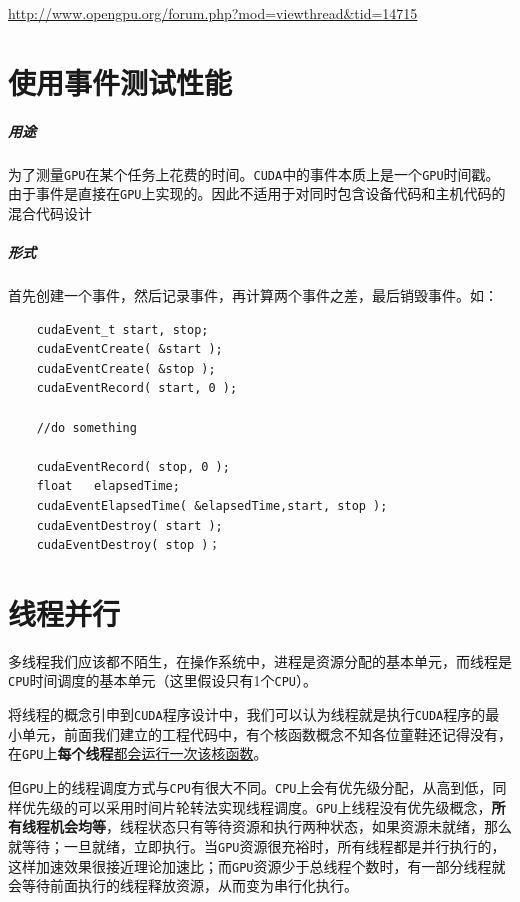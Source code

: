 \documentclass[UTF8,a4paper,12pt]{ctexbook}
\begin{document}
			\url{http://www.opengpu.org/forum.php?mod=viewthread&tid=14715}
	
	\section{使用事件测试性能}
		\subparagraph{用途}为了测量\verb|GPU|在某个任务上花费的时间。\verb|CUDA|中的事件本质上是一个\verb|GPU|时间戳。由于事件是直接在\verb|GPU|上实现的。因此不适用于对同时包含设备代码和主机代码的混合代码设计
		
		\subparagraph{形式}首先创建一个事件，然后记录事件，再计算两个事件之差，最后销毁事件。如：
			\begin{lstlisting}
	cudaEvent_t start, stop;
	cudaEventCreate( &start );
	cudaEventCreate( &stop );
	cudaEventRecord( start, 0 );
	
	//do something
	
	cudaEventRecord( stop, 0 );
	float   elapsedTime;
	cudaEventElapsedTime( &elapsedTime,start, stop );
	cudaEventDestroy( start );
	cudaEventDestroy( stop )；
			\end{lstlisting}
		
						
	\section{线程并行}
		多线程我们应该都不陌生，在操作系统中，进程是资源分配的基本单元，而线程是\verb|CPU|时间调度的基本单元（这里假设只有1个\verb|CPU|）。 
		
		将线程的概念引申到\verb|CUDA|程序设计中，我们可以认为线程就是执行\verb|CUDA|程序的最小单元，前面我们建立的工程代码中，有个核函数概念不知各位童鞋还记得没有，在\verb|GPU|上\textbf{每个线程}\underline{都会运行一次该核函数}。 
		
		但\verb|GPU|上的线程调度方式与\verb|CPU|有很大不同。\verb|CPU|上会有优先级分配，从高到低，同样优先级的可以采用时间片轮转法实现线程调度。\verb|GPU|上线程没有优先级概念，\textbf{所有线程机会均等}，线程状态只有等待资源和执行两种状态，如果资源未就绪，那么就等待；一旦就绪，立即执行。当\verb|GPU|资源很充裕时，所有线程都是并行执行的，这样加速效果很接近理论加速比；而\verb|GPU|资源少于总线程个数时，有一部分线程就会等待前面执行的线程释放资源，从而变为串行化执行。 
		
\end{document}
